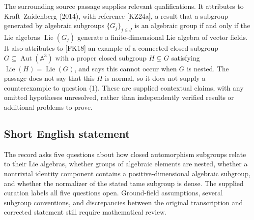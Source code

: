 \documentclass[11pt]{article}
\begin{document}
The surrounding source passage supplies relevant qualifications. It attributes to Kraft--Zaidenberg (2014), with reference [KZ24a], a result that a subgroup generated by algebraic subgroups \(\{G_j\}_{j\in J}\) is an algebraic group if and only if the Lie algebras \(\operatorname{Lie}(G_j)\) generate a finite-dimensional Lie algebra of vector fields. It also attributes to [FK18] an example of a connected closed subgroup \(G\subseteq\operatorname{Aut}(\mathbb A^3)\) with a proper closed subgroup \(H\subsetneq G\) satisfying \(\operatorname{Lie}(H)=\operatorname{Lie}(G)\), and says this cannot occur when \(G\) is nested. The passage does not say that this \(H\) is normal, so it does not supply a counterexample to question (1). These are supplied contextual claims, with any omitted hypotheses unresolved, rather than independently verified results or additional problems to prove.
\subsection{Short English statement}
The record asks five questions about how closed automorphism subgroups relate to their Lie algebras, whether groups of algebraic elements are nested, whether a nontrivial identity component contains a positive-dimensional algebraic subgroup, and whether the normalizer of the stated tame subgroup is dense. The supplied curation labels all five questions open. Ground-field assumptions, several subgroup conventions, and discrepancies between the original transcription and corrected statement still require mathematical review.
\end{document}
